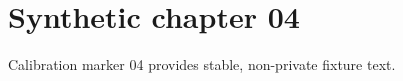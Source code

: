 \chapter{Synthetic chapter 04}\label{chap:04}
Calibration marker 04 provides stable, non-private fixture text.
